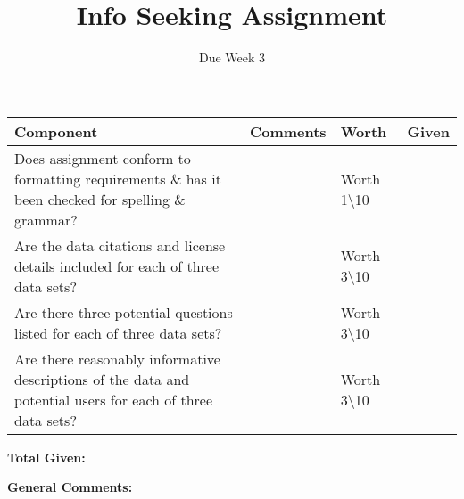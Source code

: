 \documentclass[12pt]{article}
\title{Info Seeking Assignment}
\author{Due Week 3}
\date{\vspace{-5ex}}%
\newcommand\tab[1][1cm]{\hspace*{#1}}
\begin{document}
	\maketitle
		\renewcommand{\arraystretch}{3}
		\begin{tabular}{|p{6cm}|p{6cm}|p{2cm}|p{2cm}|}
			\hline
			\textbf{Component} & \textbf{Comments} & \textbf{Worth} & \textbf{Given}\\
			\hline
			Does assignment conform to formatting requirements \& has it been checked for spelling \& grammar?  & & Worth 1\textbackslash10 & \\
			\hline
			Are the data citations and license details included for each of three data sets? & & Worth 3\textbackslash10 & \\
			\hline
			Are there three potential questions listed for each of three data sets? & & Worth 3\textbackslash10 & \\
			\hline
			Are there reasonably informative descriptions of the data and potential users for each of three data sets? & & Worth 3\textbackslash10 & \\
			\hline
		\end{tabular}

\begin{flushright}
	\textbf{Total Given:}\tab[3.3cm]
\end{flushright}


	\textbf{General Comments:}

	
\end{document}
